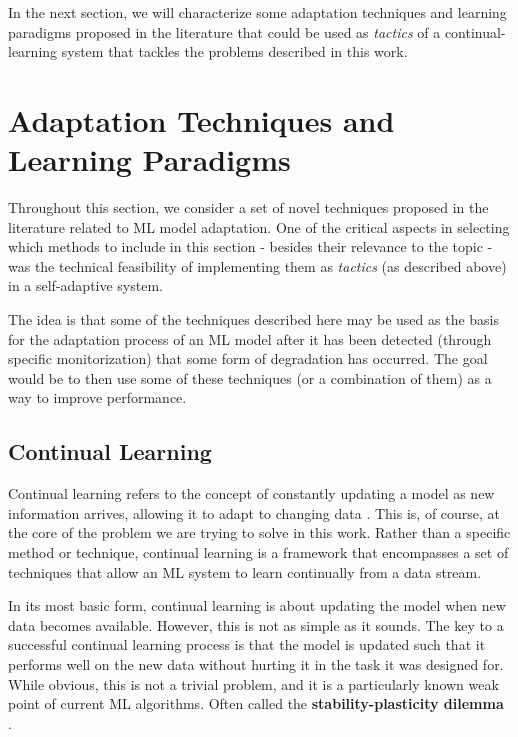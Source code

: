 \documentclass[../main.tex]{subfiles}
\begin{document}
    In the next section, we will characterize some adaptation techniques and learning paradigms proposed in the literature that could be used as \textit{tactics} of a continual-learning system that tackles the problems described in this work.
    
    
    \section{Adaptation Techniques and Learning Paradigms} \label{sec:relevant_techniques} 

    Throughout this section, we consider a set of novel techniques proposed in the literature related to ML model adaptation. One of the critical aspects in selecting which methods to include in this section - besides their relevance to the topic - was the technical feasibility of implementing them as \textit{tactics} (as described above) in a self-adaptive system. 

    The idea is that some of the techniques described here may be used as the basis for the adaptation process of an ML model after it has been detected (through specific monitorization) that some form of degradation has occurred. The goal would be to then use some of these techniques (or a combination of them) as a way to improve performance.

    \subsection{Continual Learning} \label{sec:continual_learning} 
	
    Continual learning refers to the concept of constantly updating a model as new information arrives, allowing it to adapt to changing data \cite{huyen_designing_2022}. This is, of course, at the core of the problem we are trying to solve in this work. Rather than a specific method or technique, continual learning is a framework that encompasses a set of techniques that allow an ML system to learn continually from a data stream.

    In its most basic form,  continual learning is about updating the model when new data becomes available. However, this is not as simple as it sounds. The key to a successful continual learning process is that the model is updated such that it performs well on the new data without hurting it in the task it was designed for. While obvious, this is not a trivial problem, and it is a particularly known weak point of current ML algorithms. Often called the \textbf{stability-plasticity dilemma} \cite{mermillodStabilityplasticityDilemmaInvestigating2013}.
\end{document}
